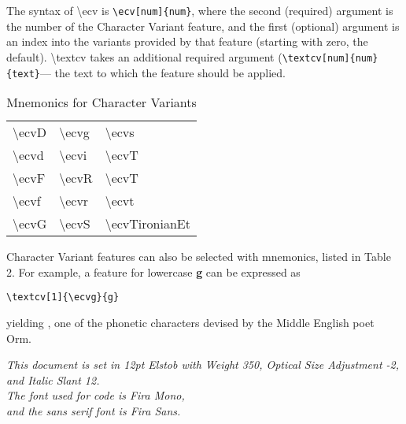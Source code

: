 \documentclass[12pt]{article}
\begin{document}
The syntax of \textbackslash ecv
is {\color{BrickRed}\verb|\ecv[num]{num}|}, where the second (required) argument is the number of the Character Variant feature,
and the first (optional) argument is an index into the variants provided by that feature (starting with zero, the default).
\textbackslash textcv takes an additional required argument ({\color{BrickRed}\verb|\textcv[num]{num}{text}|}— the text to which the
feature should be applied.

\begin{table}[ht]
    \centering
    \begin{tabular}{|l|l|l|}
    \hline
    \textbackslash ecvD & \textbackslash ecvg & \textbackslash ecvs\\

    \textbackslash ecvd & \textbackslash ecvi & \textbackslash ecvT\\

    \textbackslash ecvF & \textbackslash ecvR & \textbackslash ecvT\\

    \textbackslash ecvf & \textbackslash ecvr & \textbackslash ecvt\\

    \textbackslash ecvG & \textbackslash ecvS & \textbackslash ecvTironianEt\\
    \hline
\end{tabular}
\caption{Mnemonics for Character Variants}
\end{table}

Character Variant features can also be selected with mnemonics, listed in Table 2. For example, a feature for
lowercase \textbf{g} can be expressed as

\begin{center}
{\color{BrickRed}\small\verb|\textcv[1]{\ecvg}{g}|}
\end{center}

\noindent yielding \textbf{}, one of the phonetic characters devised by
the Middle English poet Orm.

\vspace*{\fill}

\begin{center}
    \itshape This document is set in 12pt Elstob with Weight 350, Optical Size Adjustment -2, and Italic Slant 12.\\
    The font used for code is Fira Mono,\\
    and the sans serif font is Fira Sans.
\end{center}
\end{document}
